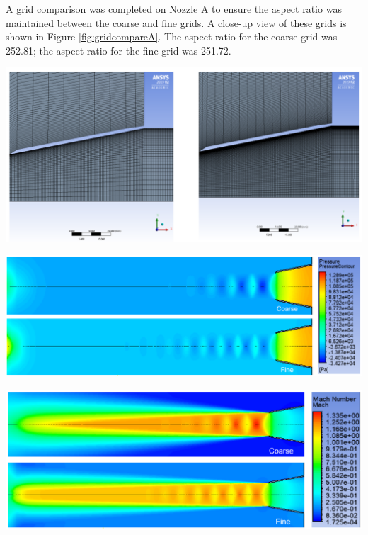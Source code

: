 \documentclass[12pt]{article} %
\begin{document}
A grid comparison was completed on Nozzle A to ensure the aspect ratio was maintained between the coarse and fine grids. A close-up view of these grids is shown in Figure \ref{fig:gridcompareA}. The aspect ratio for the coarse grid was 252.81; the aspect ratio for the fine grid was 251.72.

\begin{center}
    \includegraphics[width = \linewidth]{GridCompareA.png}
    \label{fig:gridcompareA}
\end{center}

\begin{center}
    \includegraphics[width = \linewidth]{GridCompareA_Pressure.PNG}
    \label{fig:gridcompareA_Pressure}
\end{center}

\begin{center}
    \includegraphics[width = \linewidth]{GridCompareA_Mach.PNG}
    \label{fig:gridcompareA_Mach}
\end{center}
\end{document}
